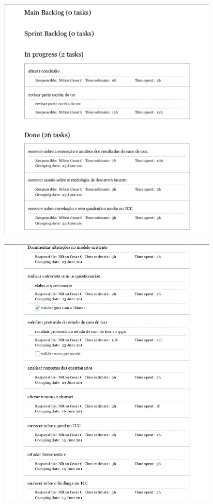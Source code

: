 \begin{apendicesenv}
\begin{figure}[h!]
\centering
\includegraphics[keepaspectratio=false,scale=0.60]{figuras/figuras_nilton/kanban1.eps}
\end{figure}

\begin{figure}[h!]
\centering
\includegraphics[keepaspectratio=false,scale=0.60]{figuras/figuras_nilton/kanban2.eps}
\end{figure}


\end{apendicesenv}
